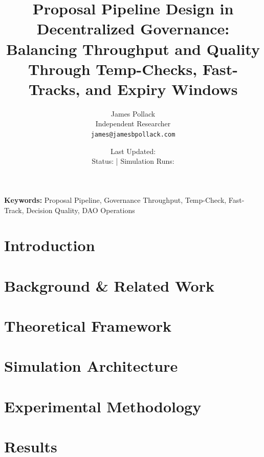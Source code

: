 \documentclass[11pt]{article}
\title{
    \textbf{Proposal Pipeline Design in Decentralized Governance:}\\
    \large Balancing Throughput and Quality Through Temp-Checks, Fast-Tracks, and Expiry Windows
}
\author{
    James Pollack\\
    Independent Researcher\\
    \texttt{james@jamesbpollack.com}
}
\date{
    Last Updated: \lastupdate\\
    \small Status: \paperstatus{} | Simulation Runs: \experimentruns{}
}
\begin{document}
\maketitle

\begin{abstract}

\end{abstract}

\textbf{Keywords:} Proposal Pipeline, Governance Throughput, Temp-Check, Fast-Track, Decision Quality, DAO Operations


\section{Introduction}
\label{sec:introduction}


\section{Background \& Related Work}
\label{sec:background}


\section{Theoretical Framework}
\label{sec:theory}


\section{Simulation Architecture}
\label{sec:architecture}


\section{Experimental Methodology}
\label{sec:methodology}


\section{Results}
\label{sec:results}

\end{document}
